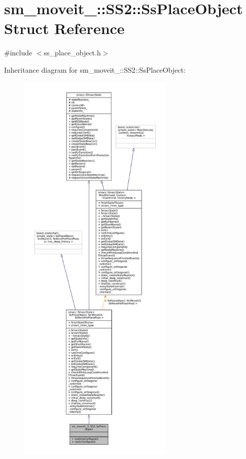 \hypertarget{structsm__moveit__3_1_1SS2_1_1SsPlaceObject}{}\section{sm\+\_\+moveit\+\_\+:\+:S\+S2\+:\+:Ss\+Place\+Object Struct Reference}
\label{structsm__moveit__3_1_1SS2_1_1SsPlaceObject}


{\ttfamily \#include $<$ss\+\_\+place\+\_\+object.\+h$>$}



Inheritance diagram for sm\+\_\+moveit\+\_\+:\+:S\+S2\+:\+:Ss\+Place\+Object\+:
\nopagebreak
\begin{figure}[H]
\begin{center}
\leavevmode
\includegraphics[height=550pt]{structsm__moveit__3_1_1SS2_1_1SsPlaceObject__inherit__graph}
\end{center}
\end{figure}


